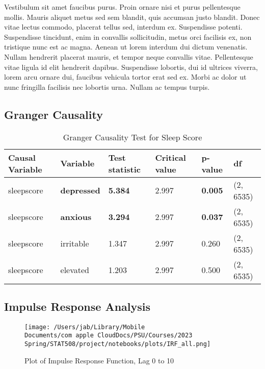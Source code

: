 \documentclass{article}
\begin{document}
Vestibulum sit amet faucibus purus. Proin ornare nisi et purus
pellentesque mollis. Mauris aliquet metus sed sem blandit, quis accumsan
justo blandit. Donec vitae lectus commodo, placerat tellus sed, interdum
ex. Suspendisse potenti. Suspendisse tincidunt, enim in convallis
sollicitudin, metus orci facilisis ex, non tristique nunc est ac magna.
Aenean ut lorem interdum dui dictum venenatis. Nullam hendrerit placerat
mauris, et tempor neque convallis vitae. Pellentesque vitae ligula id
elit hendrerit dapibus. Suspendisse lobortis, dui id ultrices viverra,
lorem arcu ornare dui, faucibus vehicula tortor erat sed ex. Morbi ac
dolor ut nunc fringilla facilisis nec lobortis urna. Nullam ac tempus
turpis.

\hypertarget{granger-causality-1}{%
\subsection{Granger Causality}\label{granger-causality-1}}

\begin{table}[hb]
    \centering
    \begin{tabular}{llllll}
    \toprule
        \textbf{Causal Variable} & \textbf{Variable} & \textbf{Test statistic} & \textbf{Critical value} & \textbf{p-value} & \textbf{df} \\
        \midrule
        sleepscore & \textbf{depressed} & \textbf{5.384} & 2.997 & \textbf{0.005} & (2, 6535) \\
        sleepscore & \textbf{anxious} & \textbf{3.294} & 2.997 & \textbf{0.037} & (2, 6535) \\
        sleepscore & irritable & 1.347 & 2.997 & 0.260 & (2, 6535) \\
        sleepscore & elevated & 1.203 & 2.997 & 0.500 & (2, 6535) \\
      \bottomrule
    \end{tabular}
    \caption{Granger Causality Test for Sleep Score}
    \label{Granger}
\end{table}


\hypertarget{impulse-response-analysis-1}{%
\subsection{Impulse Response Analysis}\label{impulse-response-analysis-1}}


\begin{figure}[ht]
\centering
  \texttt{[image: /Users/jab/Library/Mobile Documents/com~apple~CloudDocs/PSU/Courses/2023 Spring/STAT508/project/notebooks/plots/IRF\_all.png]}
  \caption{Plot of Impulse Response Function, Lag 0 to 10}
  \label{IRF}
\end{figure}
\end{document}
